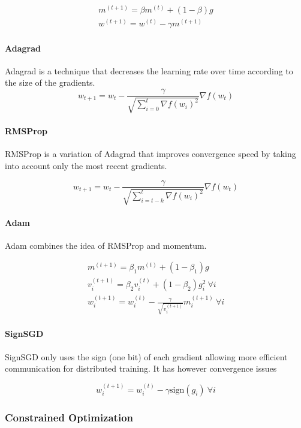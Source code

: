\documentclass{article}
\begin{document}
\begin{gather*}
m^{(t+1)} = \beta m^{(t)} + (1 - \beta)g \\
w^{(t+1)} = w^{(t)} - \gamma m^{(t+1)}
\end{gather*}

\paragraph{Adagrad}

Adagrad is a technique that decreases the learning rate over time according to the size of the gradients.
$$
w_{t+1} = w_t - \frac{\gamma}{\sqrt{\sum_{i=0}^t \nabla f(w_i)^2}} \nabla f(w_t)
$$

\paragraph{RMSProp}

RMSProp is a variation of Adagrad that improves convergence speed by taking into account only the most recent gradients.

$$
w_{t+1} = w_t - \frac{\gamma}{\sqrt{\sum_{i=t-k}^t \nabla f(w_i)^2}} \nabla f(w_t)
$$

\paragraph{Adam}

Adam combines the idea of RMSProp and momentum.

\begin{gather*}
m^{(t+1)} = \beta_1 m^{(t)} + (1 - \beta_1)g \\
v_i^{(t+1)} = \beta_2 v_i^{(t)} + (1 - \beta_2) g_i^2 \ \forall i \\
w_i^{(t+1)} = w_i^{(t)} - \frac{\gamma}{\sqrt{v_i^{(t+1)}}} m_i^{(t+1)} \ \forall i
\end{gather*}

\paragraph{SignSGD}

SignSGD only uses the sign (one bit) of each gradient allowing more efficient communication for distributed training. 
It has however convergence issues

$$
w_i^{(t+1)} = w_i^{(t)} - \gamma \text{sign}(g_i) \ \forall i
$$

\subsubsection{Constrained Optimization}
\end{document}
